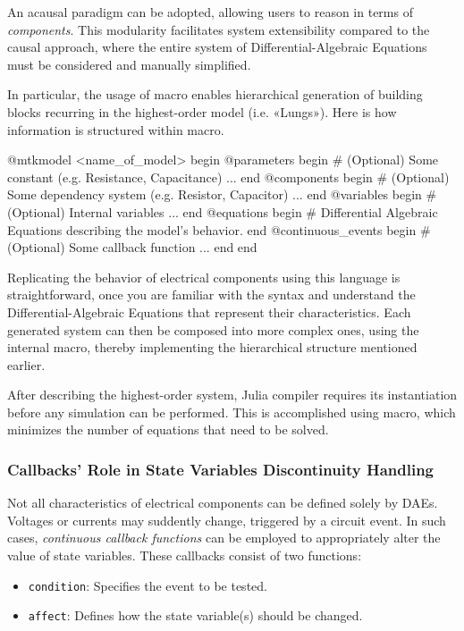 An acausal paradigm can be adopted, allowing users to reason in terms
of \emph{components}\cite{mtkdocs2024}. This modularity facilitates
system extensibility compared to the causal approach, where the entire
system of Differential-Algebraic Equations must be considered and
manually simplified\cite{ma2024}.

In particular, the usage of  macro enables
hierarchical generation of building blocks recurring in the
highest-order model (i.e. «Lungs»).  Here is how information is
structured within  macro.

\begin{jllisting}[label=@mtkmodel, caption={\jlinl{@mtkmodel}: a macro for systems prototyping.}]
  @mtkmodel <name_of_model> begin
      @parameters begin
          # (Optional) Some constant (e.g. Resistance, Capacitance) ...
      end
      @components begin
          # (Optional) Some dependency system (e.g. Resistor, Capacitor) ...
      end
      @variables begin
          # (Optional) Internal variables ...
      end
      @equations begin
          # Differential Algebraic Equations describing the model's behavior.
      end
      @continuous_events begin
          # (Optional) Some callback function ...
      end
  end
\end{jllisting}

Replicating the behavior of electrical components using this language
is straightforward, once you are familiar with the syntax and
understand the Differential-Algebraic Equations that represent their
characteristics.  Each generated system can then be composed into more
complex ones, using the internal  macro, thereby
implementing the hierarchical structure mentioned earlier.

After describing the highest-order system, Julia compiler requires its
instantiation before any simulation can be performed.  This is
accomplished using  macro, which minimizes the number
of equations that need to be solved.

\subsubsection{Callbacks' Role in State Variables Discontinuity
  Handling}
\label{subsubsec:callbacks}

Not all characteristics of electrical components can be defined solely
by DAEs.  Voltages or currents may suddently change, triggered by a
circuit event.  In such cases, \emph{continuous callback functions}
can be employed to appropriately alter the value of state variables.
These callbacks consist of two functions:
\begin{itemize}
\item \texttt{condition}: Specifies the event to be tested.
\item \texttt{affect}: Defines how the state variable(s) should be
  changed.
\end{itemize}

